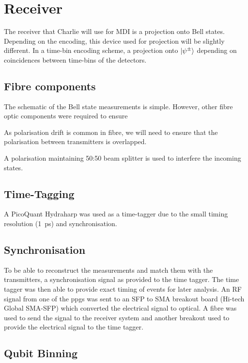 \section{Receiver}

The receiver that Charlie will use for \ac{MDI} is a projection onto Bell states. Depending on the encoding, this device used for projection will be slightly different. In a time-bin encoding scheme, a projection onto $\ket{\psi^\pm}$ depending on coincidences between time-bins of the detectors.

\subsection{Fibre components}

The schematic of the Bell state measurements is simple. However, other fibre optic components were required to ensure 

As polarisation drift is common in fibre, we will need to ensure that the polarisation between transmitters is overlapped. 

A polarisation maintaining 50:50 beam splitter is used to interfere the incoming states.

\subsection{Time-Tagging}

A PicoQuant Hydraharp was used as a time-tagger due to the small timing resolution (\SI{1}{ps}) and synchronisation.

\subsection{Synchronisation}

To be able to reconstruct the measurements and match them with the transmitters, a synchronisation signal as provided to the time tagger. The time tagger was then able to provide exact timing of events for later analysis. An RF signal from one of the \acp{ppg} was sent to an SFP to SMA breakout board (Hi-tech Global SMA-SFP) which converted the electrical signal to optical. A fibre was used to send the signal to the receiver system and another breakout used to provide the electrical signal to the time tagger. 

\subsection{Qubit Binning}

